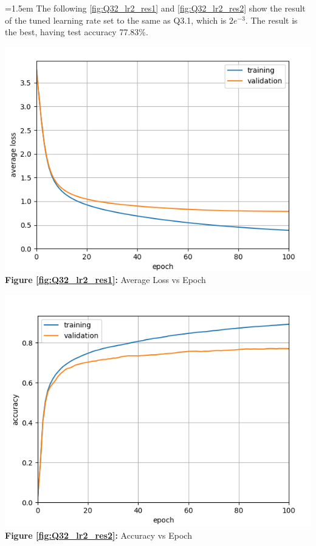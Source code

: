\documentclass{article}
\begin{document}
	\hangindent=1.5em \hspace{1.5em}The following \autoref{fig:Q32_lr2_res1} and \autoref{fig:Q32_lr2_res2} show the result of the tuned learning rate set to the same as Q3.1, which is $2e^{-3}$. The result is the best, having test accuracy 77.83\%.
	\newline		
	
	\begin{minipage}{0.48\linewidth}
	\centering
	\includegraphics[width=\linewidth]{./Q31_res_loss.png}
	\textbf{Figure \ref{fig:Q32_lr2_res1}:} Average Loss vs Epoch %
	\label{fig:Q32_lr2_res1}         %
	\end{minipage}
\hfill
	\begin{minipage}{0.48\linewidth}
	\centering
	\includegraphics[width=\linewidth]{./Q31_res_acc.png}
	\textbf{Figure \ref{fig:Q32_lr2_res2}:} Accuracy vs Epoch  %
	\label{fig:Q32_lr2_res2}         %
	\end{minipage}		
	\newline
	\newline
	
\end{document}
